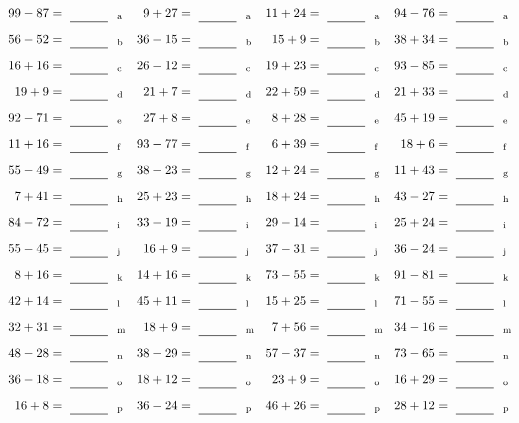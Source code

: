 \documentclass
[
  draft    = true,
  fontsize = 11pt,
  parskip  = half-
]
{scrartcl}
\begin{document}
\clearpage
\begin{align*}
    \pline{99-87}&=\rline{a}
  & \pline{9+27}&=\rline{a}
  & \pline{11+24}&=\rline{a}
  & \pline{94-76}&=\rline{a} \\[1ex]
    \pline{56-52}&=\rline{b}
  & \pline{36-15}&=\rline{b}
  & \pline{15+9}&=\rline{b}
  & \pline{38+34}&=\rline{b} \\[1ex]
    \pline{16+16}&=\rline{c}
  & \pline{26-12}&=\rline{c}
  & \pline{19+23}&=\rline{c}
  & \pline{93-85}&=\rline{c} \\[1ex]
    \pline{19+9}&=\rline{d}
  & \pline{21+7}&=\rline{d}
  & \pline{22+59}&=\rline{d}
  & \pline{21+33}&=\rline{d} \\[1ex]
    \pline{92-71}&=\rline{e}
  & \pline{27+8}&=\rline{e}
  & \pline{8+28}&=\rline{e}
  & \pline{45+19}&=\rline{e} \\[1ex]
    \pline{11+16}&=\rline{f}
  & \pline{93-77}&=\rline{f}
  & \pline{6+39}&=\rline{f}
  & \pline{18+6}&=\rline{f} \\[1ex]
    \pline{55-49}&=\rline{g}
  & \pline{38-23}&=\rline{g}
  & \pline{12+24}&=\rline{g}
  & \pline{11+43}&=\rline{g} \\[1ex]
    \pline{7+41}&=\rline{h}
  & \pline{25+23}&=\rline{h}
  & \pline{18+24}&=\rline{h}
  & \pline{43-27}&=\rline{h} \\[1ex]
    \pline{84-72}&=\rline{i}
  & \pline{33-19}&=\rline{i}
  & \pline{29-14}&=\rline{i}
  & \pline{25+24}&=\rline{i} \\[1ex]
    \pline{55-45}&=\rline{j}
  & \pline{16+9}&=\rline{j}
  & \pline{37-31}&=\rline{j}
  & \pline{36-24}&=\rline{j} \\[1ex]
    \pline{8+16}&=\rline{k}
  & \pline{14+16}&=\rline{k}
  & \pline{73-55}&=\rline{k}
  & \pline{91-81}&=\rline{k} \\[1ex]
    \pline{42+14}&=\rline{l}
  & \pline{45+11}&=\rline{l}
  & \pline{15+25}&=\rline{l}
  & \pline{71-55}&=\rline{l} \\[1ex]
    \pline{32+31}&=\rline{m}
  & \pline{18+9}&=\rline{m}
  & \pline{7+56}&=\rline{m}
  & \pline{34-16}&=\rline{m} \\[1ex]
    \pline{48-28}&=\rline{n}
  & \pline{38-29}&=\rline{n}
  & \pline{57-37}&=\rline{n}
  & \pline{73-65}&=\rline{n} \\[1ex]
    \pline{36-18}&=\rline{o}
  & \pline{18+12}&=\rline{o}
  & \pline{23+9}&=\rline{o}
  & \pline{16+29}&=\rline{o} \\[1ex]
    \pline{16+8}&=\rline{p}
  & \pline{36-24}&=\rline{p}
  & \pline{46+26}&=\rline{p}
  & \pline{28+12}&=\rline{p}
\end{align*}
\end{document}
